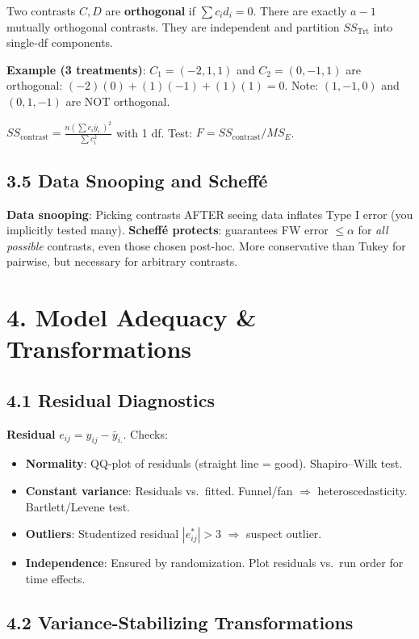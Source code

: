\documentclass[9pt,letterpaper]{article}
\begin{document}
Two contrasts $C,D$ are \textbf{orthogonal} if $\sum c_i d_i = 0$. There are exactly $a-1$ mutually orthogonal contrasts. They are independent and partition $SS_{\text{Trt}}$ into single-df components.

\textbf{Example (3 treatments)}: $C_1=(-2,1,1)$ and $C_2=(0,-1,1)$ are orthogonal: $(-2)(0)+(1)(-1)+(1)(1)=0$. Note: $(1,-1,0)$ and $(0,1,-1)$ are NOT orthogonal.

$SS_{\text{contrast}} = \frac{n(\sum c_i \bar{y}_{i.})^2}{\sum c_i^2}$ with 1 df. Test: $F = SS_{\text{contrast}}/MS_E$.

\subsection{3.5 Data Snooping and Scheff\'e}

\textbf{Data snooping}: Picking contrasts AFTER seeing data inflates Type I error (you implicitly tested many). \textbf{Scheff\'e protects}: guarantees FW error $\le \alpha$ for \emph{all possible} contrasts, even those chosen post-hoc. More conservative than Tukey for pairwise, but necessary for arbitrary contrasts.

\section{4. Model Adequacy \& Transformations}

\subsection{4.1 Residual Diagnostics}
\textbf{Residual} $e_{ij}=y_{ij}-\bar{y}_{i.}$. Checks:
\begin{itemize}
    \item \textbf{Normality}: QQ-plot of residuals (straight line = good). Shapiro--Wilk test.
    \item \textbf{Constant variance}: Residuals vs.\ fitted. Funnel/fan $\Rightarrow$ heteroscedasticity. Bartlett/Levene test.
    \item \textbf{Outliers}: Studentized residual $|e^*_{ij}| > 3$ $\Rightarrow$ suspect outlier.
    \item \textbf{Independence}: Ensured by randomization. Plot residuals vs.\ run order for time effects.
\end{itemize}

\subsection{4.2 Variance-Stabilizing Transformations}
\end{document}
